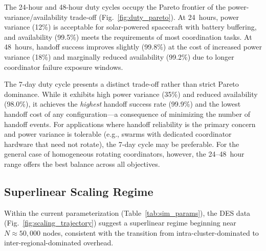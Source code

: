 \documentclass[journal]{IEEEtran}
\begin{document}
The 24-hour and 48-hour duty cycles occupy the Pareto frontier of the power-variance/availability trade-off (Fig.~\ref{fig:duty_pareto}). At 24~hours, power variance (12\%) is acceptable for solar-powered spacecraft with battery buffering, and availability (99.5\%) meets the requirements of most coordination tasks. At 48~hours, handoff success improves slightly (99.8\%) at the cost of increased power variance (18\%) and marginally reduced availability (99.2\%) due to longer coordinator failure exposure windows.

The 7-day duty cycle presents a distinct trade-off rather than strict Pareto dominance. While it exhibits high power variance (35\%) and reduced availability (98.0\%), it achieves the \emph{highest} handoff success rate (99.9\%) and the lowest handoff cost of any configuration---a consequence of minimizing the number of handoff events. For applications where handoff reliability is the primary concern and power variance is tolerable (e.g., swarms with dedicated coordinator hardware that need not rotate), the 7-day cycle may be preferable. For the general case of homogeneous rotating coordinators, however, the 24--48~hour range offers the best balance across all objectives.

\subsection{Superlinear Scaling Regime}

Within the current parameterization (Table~\ref{tab:sim_params}), the DES data (Fig.~\ref{fig:scaling_trajectory}) suggest a superlinear regime beginning near $N \approx 50{,}000$ nodes, consistent with the transition from intra-cluster-dominated to inter-regional-dominated overhead.
\end{document}
